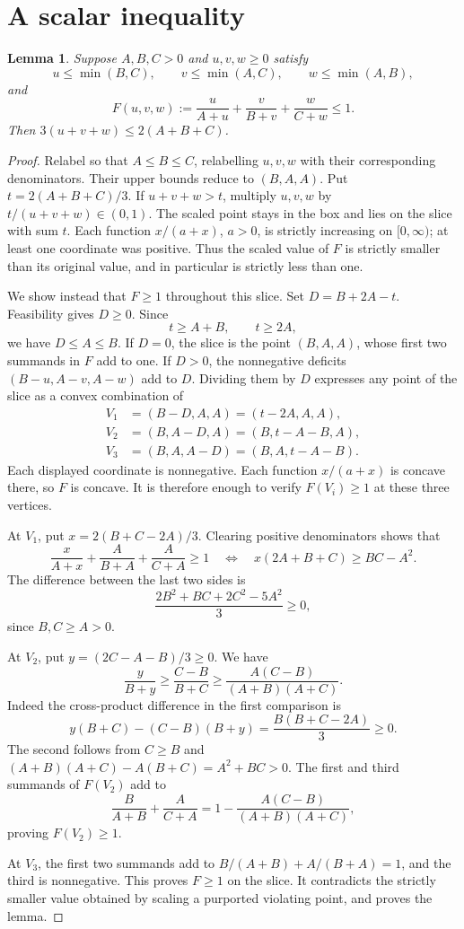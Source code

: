 \documentclass[11pt]{article}
\newtheorem{lemma}[theorem]{Lemma}
\begin{document}
\section{A scalar inequality}
\begin{lemma}\label{lem:scalar}
Suppose $A,B,C>0$ and $u,v,w\ge0$ satisfy
\[
 u\le\min(B,C),\qquad v\le\min(A,C),\qquad w\le\min(A,B),
\]
and
\begin{equation}\label{eq:F}
 F(u,v,w):=\frac{u}{A+u}+\frac{v}{B+v}+\frac{w}{C+w}\le1.
\end{equation}
Then $3(u+v+w)\le2(A+B+C)$.
\end{lemma}
\begin{proof}
Relabel so that $A\le B\le C$, relabelling $u,v,w$ with their corresponding denominators. Their upper bounds reduce to $(B,A,A)$. Put $t=2(A+B+C)/3$. If $u+v+w>t$, multiply $u,v,w$ by $t/(u+v+w)\in(0,1)$. The scaled point stays in the box and lies on the slice with sum $t$. Each function $x/(a+x)$, $a>0$, is strictly increasing on $[0,\infty)$; at least one coordinate was positive. Thus the scaled value of $F$ is strictly smaller than its original value, and in particular is strictly less than one.

We show instead that $F\ge1$ throughout this slice. Set $D=B+2A-t$. Feasibility gives $D\ge0$. Since
\[
 t\ge A+B,\qquad t\ge2A,
\]
we have $D\le A\le B$. If $D=0$, the slice is the point $(B,A,A)$, whose first two summands in $F$ add to one. If $D>0$, the nonnegative deficits $(B-u,A-v,A-w)$ add to $D$. Dividing them by $D$ expresses any point of the slice as a convex combination of
\begin{align*}
 V_1&=(B-D,A,A)=(t-2A,A,A),\\
 V_2&=(B,A-D,A)=(B,t-A-B,A),\\
 V_3&=(B,A,A-D)=(B,A,t-A-B).
\end{align*}
Each displayed coordinate is nonnegative. Each function $x/(a+x)$ is concave there, so $F$ is concave. It is therefore enough to verify $F(V_i)\ge1$ at these three vertices.

At $V_1$, put $x=2(B+C-2A)/3$. Clearing positive denominators shows that
\[
 \frac{x}{A+x}+\frac{A}{B+A}+\frac{A}{C+A}\ge1
 \quad\Longleftrightarrow\quad x(2A+B+C)\ge BC-A^2.
\]
The difference between the last two sides is
\[
 \frac{2B^2+BC+2C^2-5A^2}{3}\ge0,
\]
since $B,C\ge A>0$.

At $V_2$, put $y=(2C-A-B)/3\ge0$. We have
\[
 \frac{y}{B+y}\ge\frac{C-B}{B+C}
 \ge\frac{A(C-B)}{(A+B)(A+C)}.
\]
Indeed the cross-product difference in the first comparison is
\[
 y(B+C)-(C-B)(B+y)=\frac{B(B+C-2A)}3\ge0.
\]
The second follows from $C\ge B$ and $(A+B)(A+C)-A(B+C)=A^2+BC>0$. The first and third summands of $F(V_2)$ add to
\[
 \frac{B}{A+B}+\frac{A}{C+A}
 =1-\frac{A(C-B)}{(A+B)(A+C)},
\]
proving $F(V_2)\ge1$.

At $V_3$, the first two summands add to $B/(A+B)+A/(B+A)=1$, and the third is nonnegative. This proves $F\ge1$ on the slice. It contradicts the strictly smaller value obtained by scaling a purported violating point, and proves the lemma.
\end{proof}
\end{document}
